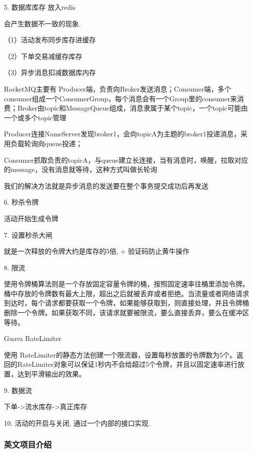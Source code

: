 5. 数据库库存 放入redis

会产生数据不一致的现象.

（1）活动发布同步库存进缓存

（2）下单交易减缓存库存

（3）异步消息扣减数据库内存

RocketMQ主要有 Producer端，负责向Broker发送消息；Consumer端，多个consumer组成一个ConsumerGroup，每个消息会有一个Group里的consumer来消费；Broker由topic和MessageQueue组成，消息隶属于某个topic，一个topic可能由一个或多个topic管理


Producer连接NameServer发现broker1，会向topicA为主题的broker1投递消息，采用负载轮询向queue投递；

Consumer抓取负责的topicA，与queue建立长连接，当有消息时，唤醒，拉取对应的message，没有消息就等待，这种方式叫做长轮询

我们的解决方法就是异步消息的发送要在整个事务提交成功后再发送

6. 秒杀令牌

活动开始生成令牌

7. 设置秒杀大闸

就是一次释放的令牌大约是库存的5倍, + 验证码防止黄牛操作

8. 限流

使用令牌桶算法则是一个存放固定容量令牌的桶，按照固定速率往桶里添加令牌。桶中存放的令牌数有最大上限，超出之后就被丢弃或者拒绝。当流量或者网络请求到达时，每个请求都要获取一个令牌，如果能够获取到，则直接处理，并且令牌桶删除一个令牌。如果获取不同，该请求就要被限流，要么直接丢弃，要么在缓冲区等待。

Guava RateLimiter


使用 RateLimiter的静态方法创建一个限流器，设置每秒放置的令牌数为5个。返回的RateLimiter对象可以保证1秒内不会给超过5个令牌，并且以固定速率进行放置，达到平滑输出的效果。

9. 数据流

下单->流水库存->真正库存


10. 活动的开启与关闭, 通过一个内部的接口实现.

\subsubsection{英文项目介绍}

